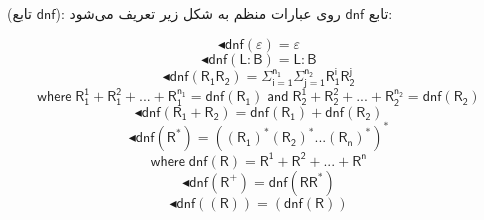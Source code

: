   \begin{defn}
  	(تابع $\mathsf{dnf}$): تابع $\mathsf{dnf}$ روی عبارات منظم به شکل زیر تعریف می‌شود:
  	
  	$$\blacktriangleleft\mathsf{dnf}(\varepsilon)=\varepsilon$$
  	$$\blacktriangleleft\mathsf{dnf}(\mathsf{L:B})=\mathsf{L:B}$$
  	$$\blacktriangleleft\mathsf{dnf}(\mathsf{R_1 R_2})= \mathsf{\Sigma_{i=1}^{n_1} \Sigma_{j=1}^{n_2} R_1^i R_2^j }$$
  	$$\mathsf{where\;R_1^1 + R_1^2 + ... + R_1^{n_1} = dnf(R_1)\;and\; R_2^1 + R_2^2 + ... + R_2^{n_2}= dnf(R_2)}$$
   $$\blacktriangleleft\mathsf{dnf (R_1+R_2)=dnf(R_1)+dnf(R_2)}$$
   $$\blacktriangleleft\mathsf{dnf (R^*)}= \mathsf{((R_1)^* (R_2)^* ... (R_n)^*)^*}$$
   $$\mathsf{where\;dnf(R)=R^1+R^2+...+R^n}$$
   $$\blacktriangleleft\mathsf{dnf(R^+)=dnf(RR^*)}$$
   $$\blacktriangleleft\mathsf{ dnf((R)) = ( dnf(R) ) }$$  
   	
  \end{defn}

